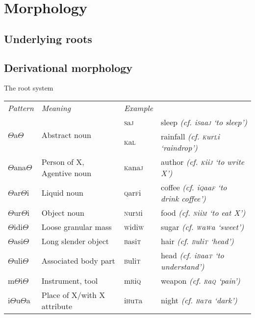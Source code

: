 \documentclass[a4paper,10pt,twoside,openright,draft]{memoir}
\newcommand{\rootpart}{$\Theta$}
\begin{document}
\chapter{Morphology}
\section{Underlying roots}
\section{Derivational morphology}

The root system

\begin{table}[ht]
    \centering
    \begin{tabular}{llll}
    \textit{Pattern} & \textit{Meaning} & \textit{Example} & \\
    \multirow{2}{*}{{\rootpart}a{\rootpart}} & \multirow{2}{*}{Abstract noun}& \textsc{s}a\textsc{j} & sleep \emph{(cf. i\textsc{s}aa\textsc{j} `to sleep')}\\
    & & \textsc{k}a\textsc{l} & rainfall \emph{(cf. \textsc{k}ur\textsc{l}i `raindrop')}\\
    {\rootpart}ana{\rootpart} & Person of X, Agentive noun & \textsc{k}ana\textsc{j} & author \emph{(cf. \textsc{k}ii\textsc{j} `to write X')}\\
    {\rootpart}ar{\rootpart}i & Liquid noun & \textsc{q}ar\textsc{f}i & coffee \emph{(cf. i\textsc{q}aa\textsc{f} `to drink coffee')} \\
    {\rootpart}ur{\rootpart}i & Object noun & \textsc{n}ur\textsc{m}i & food \emph{(cf. \textsc{n}ii\textsc{m} `to eat X')}\\
    {\rootpart}idi{\rootpart} & Loose granular mass & \textsc{w}idi\textsc{w} & sugar \emph{(cf. \textsc{w}a\textsc{w}a `sweet')} \\
    {\rootpart}asi{\rootpart} & Long slender object & \textsc{b}asi\textsc{t} & hair \emph{(cf. \textsc{b}uli\textsc{t} `head')} \\
    {\rootpart}uli{\rootpart} & Associated body part & \textsc{b}uli\textsc{t} & head \emph{(cf. i\textsc{b}aa\textsc{t} `to understand')}\\
    m{\rootpart}i{\rootpart} & Instrument, tool & m\textsc{r}i\textsc{q} & weapon \emph{(cf. \textsc{r}a\textsc{q} `pain')} \\
    i{\rootpart}u{\rootpart}a & Place of X/with X attribute & i\textsc{h}u\textsc{t}a & night \emph{(cf. \textsc{h}a\textsc{t}a `dark')} \\

\end{tabular}
\end{table}
\end{document}

